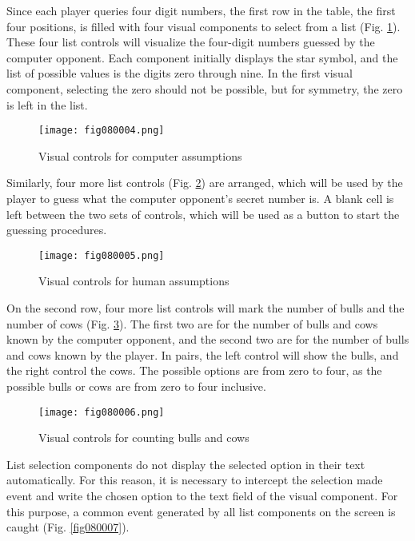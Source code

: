 Since each player queries four digit numbers, the first row in the table, the first four positions, is filled with four visual components to select from a list (Fig. \ref{fig080004}). These four list controls will visualize the four-digit numbers guessed by the computer opponent. Each component initially displays the star symbol, and the list of possible values is the digits zero through nine. In the first visual component, selecting the zero should not be possible, but for symmetry, the zero is left in the list.

\begin{figure}[H]
   \centering
   \texttt{[image: fig080004.png]}
   \caption{Visual controls for computer assumptions}
\label{fig080004}
\end{figure}

Similarly, four more list controls (Fig. \ref{fig080005}) are arranged, which will be used by the player to guess what the computer opponent's secret number is. A blank cell is left between the two sets of controls, which will be used as a button to start the guessing procedures.

\begin{figure}[H]
   \centering
   \texttt{[image: fig080005.png]}
   \caption{Visual controls for human assumptions}
\label{fig080005}
\end{figure}

On the second row, four more list controls will mark the number of bulls and the number of cows (Fig. \ref{fig080006}). The first two are for the number of bulls and cows known by the computer opponent, and the second two are for the number of bulls and cows known by the player. In pairs, the left control will show the bulls, and the right control the cows. The possible options are from zero to four, as the possible bulls or cows are from zero to four inclusive.

\begin{figure}[H]
   \centering
   \texttt{[image: fig080006.png]}
   \caption{Visual controls for counting bulls and cows}
\label{fig080006}
\end{figure}

List selection components do not display the selected option in their text automatically. For this reason, it is necessary to intercept the selection made event and write the chosen option to the text field of the visual component. For this purpose, a common event generated by all list components on the screen is caught (Fig. \ref{fig080007}).

